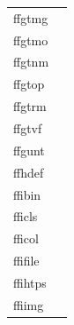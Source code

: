 \documentclass[11pt]{book}
\begin{document}
\begin{tabular}{lr}
ffgtmg  & \pageref{ffgtmg} \\
ffgtmo  & \pageref{ffgtmo} \\
ffgtnm  & \pageref{ffgtnm} \\
ffgtop    & \pageref{ffgtop} \\
ffgtrm  & \pageref{ffgtrm} \\
ffgtvf  & \pageref{ffgtvf} \\
ffgunt     & \pageref{ffgunt} \\
ffhdef    & \pageref{ffhdef} \\
ffibin    & \pageref{ffibin} \\
fficls  & \pageref{fficls} \\
fficol   & \pageref{fficol} \\
ffifile  & \pageref{ffiurl} \\
ffihtps  & \pageref{ffihtps} \\
ffiimg     & \pageref{ffiimg} \\

\end{tabular}
\end{document}
